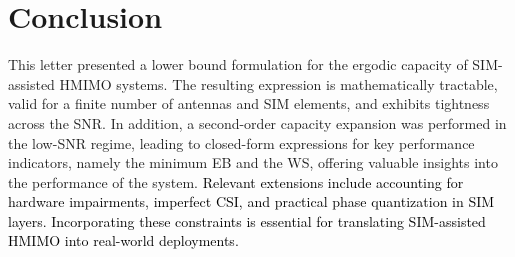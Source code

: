 \documentclass[twocolumn,10pt]{IEEEtran}
\begin{document}
	\section{Conclusion} \label{Conclusion} 
	This letter presented a lower bound formulation for the ergodic capacity of SIM-assisted HMIMO systems. The resulting expression is mathematically tractable, valid for a finite number of antennas and SIM elements, and exhibits  tightness across the SNR. In addition, a second-order capacity expansion was performed in the low-SNR regime, leading to closed-form expressions for key performance indicators, namely the minimum EB and the WS, offering valuable insights into the    performance of the system. \textcolor{black}{Relevant extensions include accounting for hardware impairments, imperfect
		CSI, and practical phase quantization in SIM layers. Incorporating these
		constraints is essential for translating SIM-assisted HMIMO into real-world
		deployments.}
\end{document}
